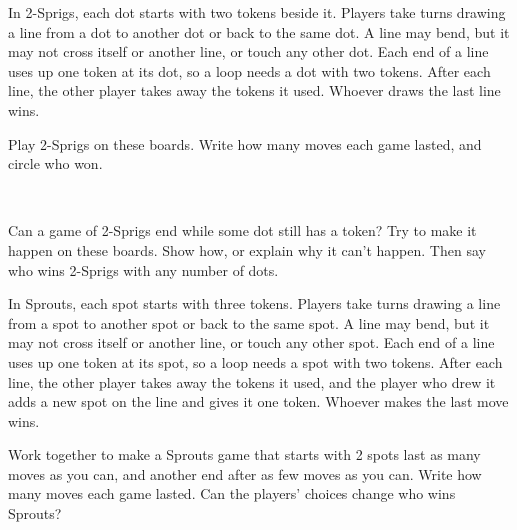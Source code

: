 \documentclass[12pt]{article}
\begin{document}
\newpage
In 2-Sprigs, each dot starts with two tokens beside it. Players take turns drawing a line from a dot to another dot or back to the same dot. A line may bend, but it may not cross itself or another line, or touch any other dot. Each end of a line uses up one token at its dot, so a loop needs a dot with two tokens. After each line, the other player takes away the tokens it used. Whoever draws the last line wins.
\gap[3mm]
\begin{center}\sprigsrules\end{center}
\gap[4mm]

\prob Play 2-Sprigs on these boards. Write how many moves each game lasted, and circle who won.
\gap[3mm]
\begin{center}
\hfill
{}
\\[4mm]
\hfill
{}
\end{center}

\newpage
\prob Can a game of 2-Sprigs end while some dot still has a token? Try to make it happen on these boards. Show how, or explain why it can't happen. Then say who wins 2-Sprigs with any number of dots.
\gap[4mm]
\begin{center}
\hspace{14mm}
\end{center}
\gap[2mm]

\newpage
In Sprouts, each spot starts with three tokens. Players take turns drawing a line from a spot to another spot or back to the same spot. A line may bend, but it may not cross itself or another line, or touch any other spot. Each end of a line uses up one token at its spot, so a loop needs a spot with two tokens. After each line, the other player takes away the tokens it used, and the player who drew it adds a new spot on the line and gives it one token. Whoever makes the last move wins.
\gap[3mm]
\begin{center}\sproutsrules\end{center}
\gap[4mm]

\prob Work together to make a Sprouts game that starts with 2 spots last as many moves as you can, and another end after as few moves as you can. Write how many moves each game lasted. Can the players' choices change who wins Sprouts?
\gap[3mm]
\begin{center}
\hfill
{}
\end{center}
\end{document}
